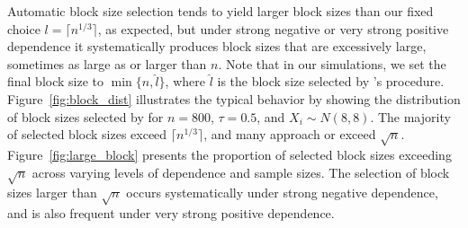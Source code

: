 \documentclass[12pt]{article}
\begin{document}
Automatic block size selection tends to yield larger block sizes than our
fixed choice $l = \lceil n^{1/3} \rceil$, as expected, but under strong
negative or very strong positive dependence it systematically produces
block sizes that are excessively large, sometimes as large as or larger
than $n$. Note that in our simulations, we set the final block size to 
$\min \{n, \hat l\}$, where
$\hat l$ is the block size selected by \citet{politis2004automatic}'s
procedure. Figure~\ref{fig:block_dist} illustrates the typical behavior by
showing the distribution of block sizes selected by \citet{politis2004automatic}
for $n = 800$, $\tau = 0.5$, and $X_i \sim N(8,8)$. The majority of selected
block sizes exceed $\lceil n^{1/3} \rceil$, and many approach or exceed
$\sqrt{n}$. Figure~\ref{fig:large_block} presents the proportion of selected
block sizes exceeding $\sqrt{n}$ across varying levels of dependence and sample 
sizes.
The selection of block sizes larger than $\sqrt{n}$ occurs systematically under 
strong
negative dependence, and is also frequent under very strong positive dependence.
\end{document}
